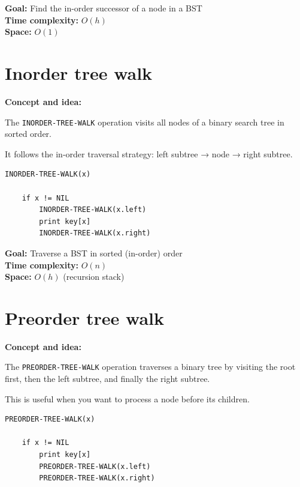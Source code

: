 \documentclass[11pt,a4paper,openany]{book}
\begin{document}
\textbf{Goal:} Find the in-order successor of a node in a BST \\

\textbf{Time complexity:} $O(h)$ \\

\textbf{Space:} $O(1)$





\vspace{2cm}



\section{Inorder tree walk}
\textbf{Concept and idea:}

The \texttt{INORDER-TREE-WALK} operation visits all nodes of a binary search tree in sorted order.

It follows the in-order traversal strategy: left subtree → node → right subtree.

\begin{lstlisting}
INORDER-TREE-WALK(x)

    if x != NIL
        INORDER-TREE-WALK(x.left)
        print key[x]
        INORDER-TREE-WALK(x.right)
\end{lstlisting}

\textbf{Goal:} Traverse a BST in sorted (in-order) order \\

\textbf{Time complexity:} $O(n)$ \\

\textbf{Space:} $O(h)$ (recursion stack)









\vspace{2cm}



\section{Preorder tree walk}
\textbf{Concept and idea:}

The \texttt{PREORDER-TREE-WALK} operation traverses a binary tree by visiting the root first, then the left subtree, and finally the right subtree.

This is useful when you want to process a node before its children.

\begin{lstlisting}
PREORDER-TREE-WALK(x)

    if x != NIL
        print key[x]
        PREORDER-TREE-WALK(x.left)
        PREORDER-TREE-WALK(x.right)
\end{lstlisting}
\end{document}
